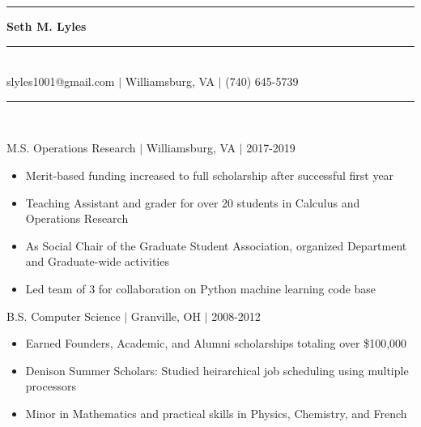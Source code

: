 \documentclass[11pt]{article}
\begin{document}
\begin{center}
\noindent\rule[5pt]{140pt}{.4pt}\LARGE\bf{ Seth M. Lyles }\rule[5pt]{140pt}{.4pt}\\ %
{\large slyles1001@gmail.com $|$ Williamsburg, VA $|$ (740) 645-5739}
\end{center}


\vspace{8pt}\hrule\vspace{10pt}
\\
\vspace{-8pt}

\hfill {M.S. Operations Research $|$ Williamsburg, VA $|$ 2017-2019}

\begin{itemize}
\item Merit-based funding increased to full scholarship after successful first year
\item Teaching Assistant and grader for over 20 students in Calculus and Operations Research
\item As Social Chair of the Graduate Student Association, organized Department and Graduate-wide activities
\item Led team of 3 for collaboration on Python machine learning code base
\end{itemize}

\hfill { B.S. Computer Science $|$ Granville, OH $|$ 2008-2012}

\begin{itemize}
\item Earned Founders, Academic, and Alumni scholarships totaling over \$100,000
\item Denison Summer Scholars: Studied heirarchical job scheduling using multiple processors
\item Minor in Mathematics and practical skills in Physics, Chemistry, and French
\end{itemize}
\end{document}
